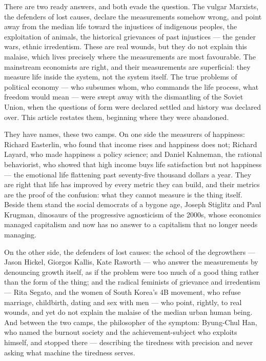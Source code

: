 \documentclass[11pt]{article}
\begin{document}
There are two ready answers, and both evade the question. The vulgar
Marxists, the defenders of lost causes, declare the measurements somehow
wrong, and point away from the median life toward the injustices of
indigenous peoples, the exploitation of animals, the historical
grievances of past injustices --- the gender wars, ethnic irredentism.
These are real wounds, but they do not explain this malaise, which lives
precisely where the measurements are most favourable. The mainstream
economists are right, and their measurements are superficial: they
measure life inside the system, not the system itself. The true problems
of political economy --- who subsumes whom, who commands the life
process, what freedom would mean --- were swept away with the
dismantling of the Soviet Union, when the questions of form were
declared settled and history was declared over. This article restates
them, beginning where they were abandoned.

They have names, these two camps. On one side the measurers of
happiness: Richard Easterlin, who found that income rises and happiness
does not; Richard Layard, who made happiness a policy science; and
Daniel Kahneman, the rational behaviorist, who showed that high income
buys life satisfaction but not happiness --- the emotional life
flattening past seventy-five thousand dollars a year. They are right
that life has improved by every metric they can build, and their
metrics are the proof of the confusion: what they cannot measure is the
thing itself. Beside them stand the social democrats of a bygone age,
Joseph Stiglitz and Paul Krugman, dinosaurs of the progressive
agnosticism of the 2000s, whose economics managed capitalism and now
has no answer to a capitalism that no longer needs managing.

On the other side, the defenders of lost causes: the school of the
degrowthers --- Jason Hickel, Giorgos Kallis, Kate Raworth --- who
answer the measurements by denouncing growth itself, as if the problem
were too much of a good thing rather than the form of the thing; and
the radical feminists of grievance and irredentism --- Rita Segato, and
the women of South Korea's 4B movement, who refuse marriage,
childbirth, dating and sex with men --- who point, rightly, to real
wounds, and yet do not explain the malaise of the median urban human
being. And between the two camps, the philosopher of the symptom:
Byung-Chul Han, who named the burnout society and the
achievement-subject who exploits himself, and stopped there ---
describing the tiredness with precision and never asking what machine
the tiredness serves.
\end{document}
